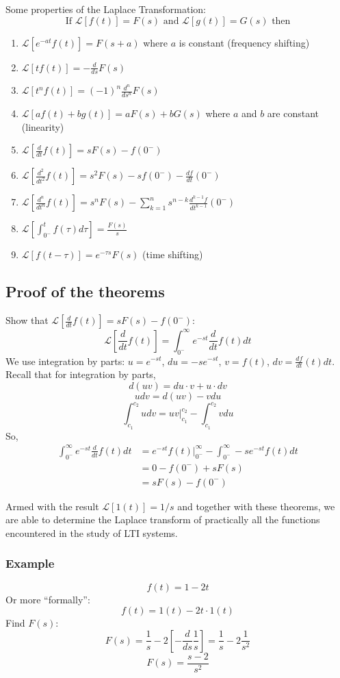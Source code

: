 \documentclass{book}
\newcommand{\LT}{\mathcal{L}}
\newcommand{\exmp}{\subsubsection*{Example}}
\begin{document}
Some properties of the Laplace Transformation:
\[ \text{If } \LT[f(t)]=F(s) \text{ and } \LT[g(t)]=G(s) \text{ then} \]
\begin{enumerate}
	\item $ \LT[e^{-at}f(t)]=F(s+a) $ where $ a $ is constant (frequency shifting)
	\item $ \LT[tf(t)]=-\frac{d}{ds}F(s) $
	\item $ \LT[t^nf(t)]=(-1)^n\frac{d^n}{ds^n}F(s) $
	\item $ \LT[af(t)+bg(t)]=aF(s)+bG(s) $ where $ a $ and $ b $ are constant (linearity)
	\item $ \LT[\frac{d}{dt}f(t)]=sF(s)-f(0^-) $
	\item $ \LT[\frac{d^2}{dt^2}f(t)]=s^2F(s)-sf(0^-)-\frac{df}{dt}(0^-) $
	\item $ \LT[\frac{d^n}{dt^n}f(t)]=s^nF(s)-\sum_{k=1}^n s^{n-k}\frac{d^{k-1}f}{dt^{k-1}}(0^-) $
	\item $ \LT[\int_{0^-}^t f(\tau) d\tau]=\frac{F(s)}{s} $
	\item $ \LT[f(t-\tau)] = e^{-\tau s}F(s) $ (time shifting)
\end{enumerate}

\subsection*{Proof of the theorems}
Show that $ \LT[\frac{d}{dt}f(t)]=sF(s)-f(0^-) $:
\[ \LT[\frac{d}{dt}f(t)] = \int_{0^-}^{\infty} e^{-st}\frac{d}{dt}f(t)dt \]
We use integration by parts: $ u = e^{-st} $, $ du=-se^{-st} $, $ v=f(t) $, $ dv=\frac{df}{dt}(t) dt $. Recall that for integration by parts,
\[ d(uv) = du\cdot v + u\cdot dv \]
\[ udv = d(uv) - vdu \]
\[ \int_{c_1}^{c_2} udv = uv|_{c_1}^{c_2} - \int_{c_1}^{c_2} vdu \]
So,
\begin{align*}
\int_{0^-}^{\infty} e^{-st}\frac{d}{dt}f(t)dt&= e^{-st}f(t)\Big|_{0^-}^{\infty} -  \int_{0^-}^{\infty}-se^{-st}f(t)dt\\
&= 0 - f(0^-) + sF(s)\\
&= sF(s)-f(0^-)
\end{align*}

Armed with the result $ \LT[1(t)] = 1/s $ and together with these theorems, we are able to determine the Laplace transform of practically all the functions encountered in the study of LTI systems.

\exmp
\[ f(t) = 1-2t \]
Or more ``formally'':
\[ f(t) = 1(t) - 2t\cdot1(t) \]
Find $ F(s) $:
\[ F(s) = \frac{1}{s} - 2\left[ -\frac{d}{ds}\frac{1}{s} \right] = \frac{1}{s} - 2\frac{1}{s^2} \]
\[ F(s) = \frac{s-2}{s^2} \]
\end{document}
